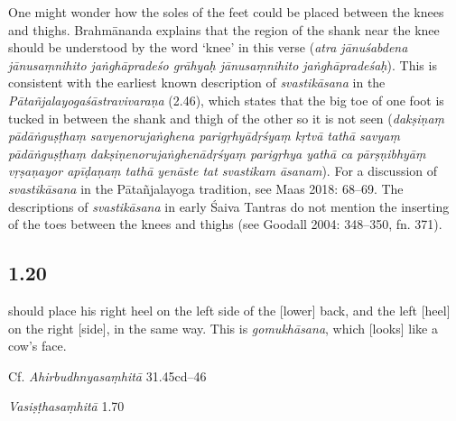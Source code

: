 \begin{ekdosis}
\begin{philcomm}[hp01_019]        
One might wonder how the soles of the feet could be placed between the knees and thighs. Brahmānanda explains that the region of the shank near the knee should be understood by the word ‘knee’ in this verse (\emph{atra jānuśabdena jānusaṃnihito jaṅghāpradeśo grāhyaḥ jānusaṃnihito jaṅghāpradeśaḥ}). This is consistent with the earliest known description of \emph{svastikāsana} in the \emph{Pātañjalayogaśāstravivaraṇa} (2.46), which states that the big toe of one foot is tucked in between the shank and thigh of the other so it is not seen (\emph{dakṣiṇaṃ pādāṅguṣṭhaṃ savyenorujaṅghena parigṛhyādṛśyaṃ kṛtvā tathā savyaṃ pādāṅguṣṭhaṃ dakṣiṇenorujaṅghenādṛśyaṃ parigṛhya yathā ca pārṣṇibhyāṃ vṛṣaṇayor apīḍaṇaṃ tathā yenāste tat svastikam āsanam}). For a discussion of \emph{svastikāsana} in the Pātañjalayoga tradition, see Maas 2018: 68–69. The descriptions of \emph{svastikāsana} in early Śaiva Tantras do not mention the inserting of the toes between the knees and thighs (see Goodall 2004: 348–350, fn. 371).
\end{philcomm}

\subsection*{1.20}
\begin{translation} should place his right heel on the left side of the [lower] back, and the left [heel] on the right [side], in the same way. This is \emph{gomukhāsana}, which [looks] like a cow's face.
\end{translation}

\begin{sources}[hp01_020]
Cf. \emph{Ahirbudhnyasaṃhitā} 31.45cd–46

\begin{versinnote}
\end{versinnote}

\emph{Vasiṣṭhasaṃhitā} 1.70

\begin{versinnote}
\end{versinnote}


\end{sources}
\end{ekdosis}
